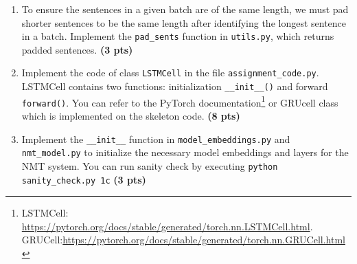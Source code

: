 \documentclass{assignment format}
\begin{document}
\begin{enumerate}[label=(\alph*)]

    \item To ensure the sentences in a given batch are of the same length, we must pad shorter sentences to be the same length after identifying the longest sentence in a batch. Implement the \texttt{pad\_sents} function in \texttt{utils.py}, which returns padded sentences. \textbf{(3 pts)}
    \item Implement the code of class \texttt{LSTMCell} in the file \texttt{assignment\_code.py}. LSTMCell contains two functions: initialization \texttt{\_\_init\_\_()} and forward \texttt{forward()}. You can refer to the PyTorch documentation\footnote{LSTMCell: \url{https://pytorch.org/docs/stable/generated/torch.nn.LSTMCell.html}. GRUCell:\url{https://pytorch.org/docs/stable/generated/torch.nn.GRUCell.html}} or GRUcell class which is implemented on the skeleton code.  \textbf{(8 pts)}
   \item Implement the \texttt{\_\_init\_\_} function in \texttt{model\_embeddings.py} and \texttt{nmt\_model.py} to initialize the necessary model embeddings and layers for the NMT system. You can run sanity check by executing \texttt{python sanity\_check.py 1c} \textbf{(3 pts)}
   

\end{enumerate}
\end{document}
